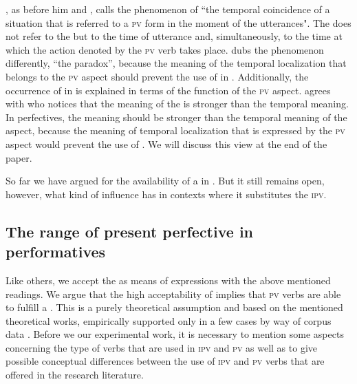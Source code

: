 \documentclass[output=paper,colorlinks,citecolor=brown,newtxmath,hidelinks]{langscibook}
\begin{document}
\citet{Dickey2000}, as before him \citet{Bondarko1971} and \citet{Galton1976}, calls the phenomenon of   “the temporal coincidence of a situation that is referred to a \textsc{pv}  form in the moment of the utterances". The   does not refer to the  but to the time of utterance and, simultaneously, to the time at which the action denoted by the \textsc{pv} verb takes place. \citet{Dewit2017} dubs the phenomenon differently, “the   paradox”, because the meaning of the temporal localization that belongs to the \textsc{pv} aspect should prevent the use of   in . Additionally, the occurrence of   in  is explained in terms of the  function of the \textsc{pv} aspect. \citet{Dewit2017} agrees with \citet{Breu2000ProblemederInteraktion} who notices that the  meaning of the   is stronger than the temporal meaning. In  perfectives, the  meaning should be stronger than the temporal meaning of the aspect, because the meaning of temporal localization that is expressed by the \textsc{pv} aspect would prevent the use of  . We will discuss this view at the end of the paper. 

So far we have argued for the availability of a   in . But it still remains open, however, what kind of influence   has in contexts where it substitutes the \textsc{ipv}. 

\subsection{The range of present perfective in performatives}\label{sub:eins:5}

Like others, we accept the   as means of expressions with the above mentioned readings. We argue that the high acceptability of   implies that \textsc{pv}  verbs are able to fulfill a . This is a purely theoretical assumption and based on the mentioned theoretical works, empirically supported only in a few cases by way of corpus data \citep{Laczinski2014,Wiemer2014}. Before we   our experimental work, it is necessary to mention some aspects concerning the type of  verbs that are used in \textsc{ipv} and \textsc{pv} as well as to give possible conceptual differences between the use of \textsc{ipv} and \textsc{pv}  verbs that are offered in the research literature.
\end{document}

